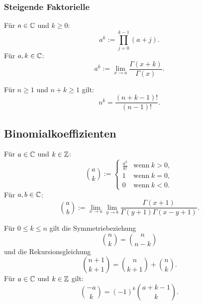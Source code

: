 \subsubsection{Steigende Faktorielle}
\begin{definition}\mbox{}\newline
Für $a\in\mathbb C$ und $k\ge 0$:
\begin{equation}
a^{\overline k} := \prod_{j=0}^{k-1} (a+j).
\end{equation}
Für $a,k\in\mathbb C$:
\begin{equation}
a^{\overline k} := \lim_{x\to a}\frac{\Gamma(x+k)}{\Gamma(x)}.
\end{equation}
\end{definition}
\noindent
Für $n\ge 1$ und $n+k\ge 1$ gilt:
\begin{equation}
n^{\overline k} = \frac{(n+k-1)!}{(n-1)!}.
\end{equation}

\subsection{Binomialkoeffizienten}
\begin{definition}[Binomialkoeffizient]\mbox{}\newline
Für $a\in\mathbb C$ und $k\in\mathbb Z$:
\begin{equation}
\binom{a}{k} := \begin{cases}
\frac{a^{\underline k}}{k!} & \text{wenn}\;k>0,\\
1 & \text{wenn}\;k=0,\\
0 & \text{wenn}\;k<0.
\end{cases}
\end{equation}
Für $a,b\in\mathbb C$:
\begin{equation}\label{eq:bc-allg}
\binom{a}{b} := \lim_{x\to a}\lim_{y\to b}
\frac{\Gamma(x+1)}{\Gamma(y+1)\Gamma(x-y+1)}.
\end{equation}
\end{definition}
\noindent
Für $0\le k\le n$ gilt die Symmetriebeziehung
\begin{equation}
\binom{n}{k} = \binom{n}{n-k}
\end{equation}
und die Rekursionsgleichung
\begin{equation}
\binom{n+1}{k+1} = \binom{n}{k+1}+\binom{n}{k}.
\end{equation}
Für $a\in\mathbb C$ und $k\in\mathbb Z$ gilt:
\begin{equation}
\binom{-a}{k} = (-1)^k \binom{a+k-1}{k}.
\end{equation}


